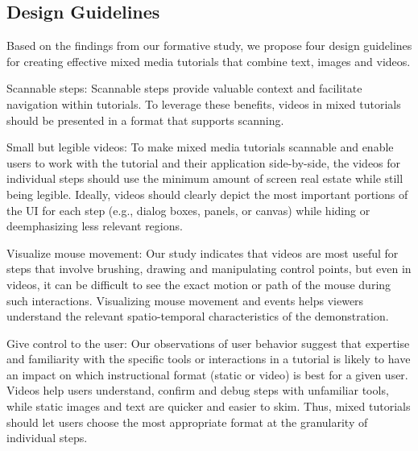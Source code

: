 \subsection{Design Guidelines}

Based on the findings from our formative study, we propose four design guidelines for creating effective mixed media tutorials that combine text, images and videos.

Scannable steps: Scannable steps provide valuable context and facilitate navigation within tutorials. To leverage these benefits, videos in mixed tutorials should be presented in a format that supports scanning.

Small but legible videos: To make mixed media tutorials scannable and enable users to work with the tutorial and their application side-by-side, the videos for individual steps should use the minimum amount of screen real estate while still being legible. Ideally, videos should clearly depict the most important portions of the UI for each step (e.g., dialog boxes, panels, or canvas) while hiding or deemphasizing less relevant regions.

Visualize mouse movement: Our study indicates that videos are most useful for steps that involve brushing, drawing and manipulating control points, but even in videos, it can be difficult to see the exact motion or path of the mouse during such interactions. Visualizing mouse movement and events helps viewers understand the relevant spatio-temporal characteristics of the demonstration.

Give control to the user: Our observations of user behavior suggest that expertise and familiarity with the specific tools or interactions in a tutorial is likely to have an impact on which instructional format (static or video) is best for a given user. Videos help users understand, confirm and debug steps with unfamiliar tools, while static images and text are quicker and easier to skim. Thus, mixed tutorials should let users choose the most appropriate format at the granularity of individual steps.
